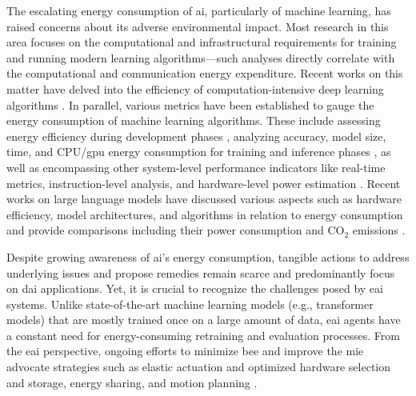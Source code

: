 \documentclass[12pt]{article}
\begin{document}
The escalating energy consumption of \acl{ai}, particularly of machine learning, has raised concerns about its adverse environmental impact. Most research in this area focuses on the computational and infrastructural requirements for training and running modern learning algorithms---such analyses directly correlate with the computational and communication energy expenditure. Recent works on this matter have delved into the efficiency of computation-intensive deep learning algorithms \cite{Schwartz2019GreenAI,Vinuesa2020roleartificialintelligence,Strubell2019EnergyPolicyConsiderations,Luccioni2023EstimatingCarbonFootprint}. In parallel, various metrics have been established to gauge the energy consumption of machine learning algorithms. These include assessing energy efficiency during development phases \cite{Zhou2020HULKEnergyEfficiency}, analyzing accuracy, model size, time, and CPU/\ac{gpu} energy consumption for training and inference phases \cite{Dalgren2019GreenMLmethodology}, as well as encompassing other system-level performance indicators like real-time metrics, instruction-level analysis, and hardware-level power estimation \cite{GarciaMartin2019Estimationenergyconsumption}. Recent works on large language models have discussed various aspects such as hardware efficiency, model architectures, and algorithms in relation to energy consumption \cite{Vries2023growingenergyfootprint} and provide comparisons including their power consumption and CO$_2$ emissions \cite{SIHCAI2023ArtificialIntelligenceIndex}.

Despite growing awareness of \ac{ai}'s energy consumption, tangible actions to address underlying issues and propose remedies remain scarce and predominantly focus on \ac{dai} applications. Yet, it is crucial to recognize the challenges posed by \ac{eai} systems. Unlike state-of-the-art machine learning models (e.g., transformer models) that are mostly trained once on a large amount of data, \ac{eai} agents have a constant need for energy-consuming retraining and evaluation processes. From the \ac{eai} perspective, ongoing efforts to minimize \ac{bee} and improve the \ac{mie} advocate strategies such as elastic actuation and optimized hardware selection and storage, energy sharing, and motion planning \cite{CUT2015Smoothrobotmovements, Mohammed2014MinimizingEnergyConsumption, Chemnitz2011Analyzingenergyconsumption,Vasarhelyi2023OverviewEnergiesProblems,Sekala2024SelectedIssuesMethods}.
\end{document}
